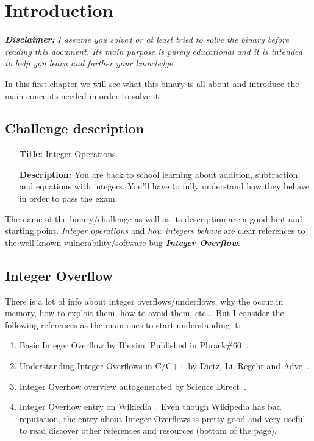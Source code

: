 \chapter{Introduction}

\textit{\textbf{Disclaimer:} I assume you solved or at least tried to solve the binary before reading this document. Its main purpose is purely educational and it is intended to help you learn and further your knowledge.}

In this first chapter we will see what this binary is all about and introduce the main concepts needed in order to solve it. 

\section{Challenge description}
\begin{itemize}
	\item[\textbf{Title:}]{Integer Operations}
	\item[\textbf{Description:}]{You are back to school learning about addition, subtraction and equations with integers. You'll have to fully understand how they behave in order to pass the exam.}
\end{itemize}

The name of the binary/challenge as well as its description are a good hint and starting point.  \textit{Integer operations} and \textit{how integers behave} are clear references to the well-known vulnerability/software bug \emph{\textbf{Integer Overflow}}.

\section{Integer Overflow}

There is a lot of info about integer overflows/underflows, why the occur in memory, how to exploit them, how to avoid them, etc... But I consider the following references as the main ones to start understanding it:
\begin{enumerate}
	\item{Basic Integer Overflow by Blexim. Published in Phrack\#60~\cite{Blexim2002}.}
	\item{Understanding Integer Overflows in C/C++ by Dietz, Li, Regehr and Adve~\cite{dietz2015understanding}.}
	\item{Integer Overflow overview autogenerated by Science Direct~\cite{IntegerOverflowScienceDirect}.}
	\item{Integer Overflow entry on Wikiedia~\cite{IntegerOverflowWikipedia}. Even though Wikipedia has bad reputation, the entry about Integer Overflows is pretty good and very useful to read discover other references and resources (bottom of the page).}
\end{enumerate}

